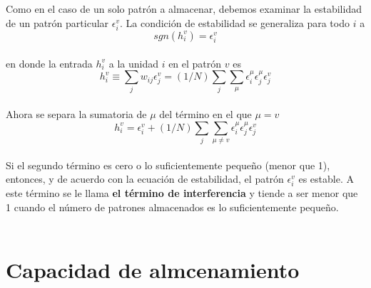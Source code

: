 \documentclass{article}
\begin{document}
Como en el caso de un solo patrón a almacenar, debemos examinar la estabilidad de un patrón particular $\epsilon_i^v$. La condición de estabilidad se generaliza para todo $i$ a
\begin{equation}
    sgn(h_i^v) = \epsilon_i^v
    \label{eq:condición de estabilidad}
\end{equation}
\\
en donde la entrada $h_i^v$ a la unidad $i$ en el patrón $v$ es
\begin{equation}
    h_i^v \equiv \sum_jw_{ij}\epsilon_j^v = (1/N)\sum_j\sum_\mu\epsilon_i^\mu\epsilon_j^\mu\epsilon_j^v
    \label{eq:condición de estabilidad}
\end{equation}
\\
Ahora se separa la sumatoria de $\mu$ del término en el que $\mu=v$
\begin{equation}
    h_i^v = \epsilon_i^v + (1/N)\sum_j\sum_{\mu\neq v}\epsilon_i^\mu\epsilon_j^\mu\epsilon_j^v
    \label{eq:condición de estabilidad}
\end{equation}
\\
Si el segundo término es cero o lo suficientemente pequeño (menor que 1), entonces, y de acuerdo con la ecuación de estabilidad, el patrón $\epsilon_i^v$ es estable. A este término se le llama \textbf{el término de interferencia} y tiende a ser menor que 1 cuando el número de patrones almacenados es lo suficientemente pequeño.
\\\\
\section{Capacidad de almcenamiento}
\end{document}
